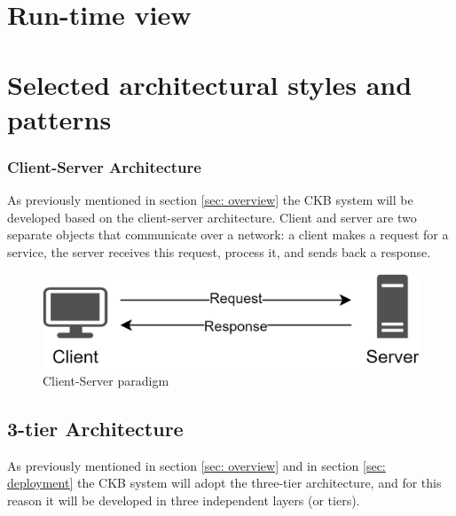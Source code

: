 \section{Run-time view}
\clearpage

\section{Selected architectural styles and patterns}
\subsubsection*{Client-Server Architecture}
As previously mentioned in section \ref{sec: overview} the CKB system will be developed based on the client-server architecture. Client and server are two separate objects that communicate over a network: a client makes a request for a service, the server receives this request, process it, and sends back a response. 
\begin{figure}[h]
    \centering 
    \includegraphics[scale=0.8]{images/CS.png}
    \caption{Client-Server paradigm}
    \label{fig:CS}
\end{figure}

\subsection*{3-tier Architecture}
As previously mentioned in section \ref{sec: overview} and in section \ref{sec: deployment} the CKB system will adopt the three-tier architecture, and for this reason it will be developed in three independent layers (or tiers).

